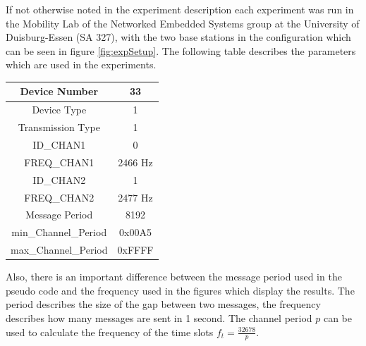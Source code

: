 If not otherwise noted in the experiment description each experiment was run in the Mobility Lab of the Networked Embedded Systems group at the University of Duisburg-Essen (SA 327), with the two base stations in the configuration which can be seen in figure \ref{fig:expSetup}. The following table describes the parameters which are used in the experiments.
\begin{center}
	\begin{tabular}{|c|c|}
		\hline Device Number & 33 \\ 
		\hline Device Type & 1 \\ 
		\hline Transmission Type & 1 \\ 
		\hline ID\_CHAN1 & 0 \\ 
		\hline FREQ\_CHAN1 & 2466 Hz \\ 
		\hline ID\_CHAN2 & 1 \\ 
		\hline FREQ\_CHAN2 & 2477 Hz \\ 
		\hline Message Period & 8192 \\ 
		\hline min\_Channel\_Period & 0x00A5 \\ 
		\hline max\_Channel\_Period & 0xFFFF \\ 
		\hline 
	\end{tabular} 		
\end{center}

Also, there is an important difference between the message period used in the pseudo code and the frequency used in the figures which display the results. The period describes the size of the gap between two messages, the frequency describes how many messages are sent in 1 second. The channel period $p$ can be used to calculate the frequency of the time slots $f_t = \frac{32678}{p}$.  
\newpage


